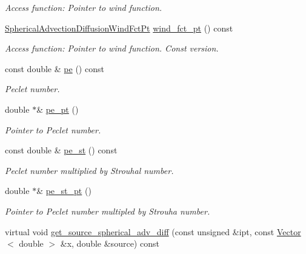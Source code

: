 \begin{DoxyCompactItemize}
\begin{DoxyCompactList}\small\item\em Access function\+: Pointer to wind function. \end{DoxyCompactList}\item 
\hyperlink{classoomph_1_1SphericalAdvectionDiffusionEquations_adef9c036e9f80c134078d8d78049199e}{Spherical\+Advection\+Diffusion\+Wind\+Fct\+Pt} \hyperlink{classoomph_1_1SphericalAdvectionDiffusionEquations_a143f3e3ec0e1ac832b957635ce5c58f0}{wind\+\_\+fct\+\_\+pt} () const
\begin{DoxyCompactList}\small\item\em Access function\+: Pointer to wind function. Const version. \end{DoxyCompactList}\item 
const double \& \hyperlink{classoomph_1_1SphericalAdvectionDiffusionEquations_a33f78b13bf746a2d0b21d3675c4c4d95}{pe} () const
\begin{DoxyCompactList}\small\item\em Peclet number. \end{DoxyCompactList}\item 
double $\ast$\& \hyperlink{classoomph_1_1SphericalAdvectionDiffusionEquations_aefe9930f320bf5931f853461253951ef}{pe\+\_\+pt} ()
\begin{DoxyCompactList}\small\item\em Pointer to Peclet number. \end{DoxyCompactList}\item 
const double \& \hyperlink{classoomph_1_1SphericalAdvectionDiffusionEquations_a7f7a29ec80961ed10841bd5e2ba9f51c}{pe\+\_\+st} () const
\begin{DoxyCompactList}\small\item\em Peclet number multiplied by Strouhal number. \end{DoxyCompactList}\item 
double $\ast$\& \hyperlink{classoomph_1_1SphericalAdvectionDiffusionEquations_ab70b9505075279b1dc935a620407df1f}{pe\+\_\+st\+\_\+pt} ()
\begin{DoxyCompactList}\small\item\em Pointer to Peclet number multipled by Strouha number. \end{DoxyCompactList}\item 
virtual void \hyperlink{classoomph_1_1SphericalAdvectionDiffusionEquations_a139999156e95fba4e789d7b72def465e}{get\+\_\+source\+\_\+spherical\+\_\+adv\+\_\+diff} (const unsigned \&ipt, const \hyperlink{classoomph_1_1Vector}{Vector}$<$ double $>$ \&x, double \&source) const

\end{DoxyCompactItemize}
